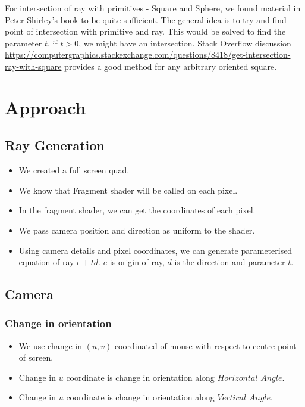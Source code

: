 \documentclass[a4paper]{article}
\begin{document}
\vspace{\baselineskip}

For intersection of ray with primitives - Square and Sphere, we found material in 
Peter Shirley's book to be quite sufficient. The general idea is to try and find 
point of intersection with primitive and ray. This would be solved to find the 
parameter $t$. if $t>0$, we might have an intersection. Stack Overflow discussion
\url{https://computergraphics.stackexchange.com/questions/8418/get-intersection-ray-with-square}
provides a good method for any arbitrary oriented square.   

\section{Approach}

\subsection{Ray Generation}
\begin{itemize}
    \item We created a full screen quad.
    \item We know that Fragment shader will be called on each pixel.
    \item In the fragment shader, we can get the coordinates of each pixel.
    \item We pass camera position and direction as uniform to the shader.
    \item Using camera details and pixel coordinates, we can generate parameterised equation of ray $e + td$.
    $e$ is origin of ray, $d$ is the direction and parameter $t$. 
\end{itemize}
 
\subsection{Camera}

\subsubsection{Change in orientation}
\begin{itemize}
    \item We use change in $(u,v)$ coordinated of mouse with respect to centre point of screen.
    \item Change in $u$ coordinate is change in orientation along $Horizontal$ $Angle$.
    \item Change in $u$ coordinate is change in orientation along $Vertical$ $Angle$.
\end{itemize}
\end{document}
